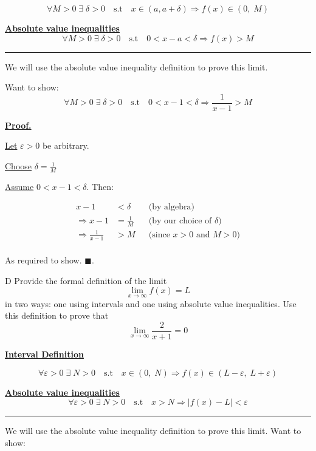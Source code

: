 \documentclass[]{article}
\begin{document}
\[
    \forall M > 0 \;\exists\;\delta > 0 \quad \text{s.t} \quad x \in(a, a+\delta)\Longrightarrow f(x) \in (0, \;M)
\]

\underline{\bf{Absolute value inequalities}}
\[
    \forall M > 0\;\exists\; \delta>0 \quad \text{s.t} \quad 
    0 < x-a < \delta \Longrightarrow f(x) >M
\]

\hrule
\vspace{0.1in}
We will use the absolute value inequality definition to prove this limit.

Want to show:
\[
    \forall M > 0\;\exists\; \delta>0 \quad \text{s.t} \quad 
    0 < x-1 < \delta \Longrightarrow \frac{1}{x-1} > M
\]


\underline{\bf{Proof.}}

\underline{Let} $\varepsilon > 0$ be arbitrary.

\medbreak

\underline{Choose} $\delta = \frac{1}{M}$

\medbreak

\underline{Assume} $0 < x-1 < \delta$. Then:

\begin{align*}
    x - 1  & < \delta
        && \text{(by algebra)} \\[6pt]
    \Longrightarrow x-1 &= \frac{1}{M} 
        && \text{(by our choice of $\delta$)} \\[6pt]
    \Longrightarrow \frac{1}{x-1}  &> M
        && \text{(since $x > 0$ and $M > 0$)} \\[6pt]
\end{align*}

As required to show. $\blacksquare$.
\begin{question}{D}
    Provide the formal definition of the limit
    \[
    \lim_{x \to \infty} f(x) = L
    \]
    in two ways: one using intervals and one using absolute value inequalities. Use this definition to prove that
    \[
    \lim_{x \to \infty} \frac{2}{x+1} = 0
    \]
\end{question}

\underline{\bf{Interval Definition}}

\[
    \forall \varepsilon> 0 \;\exists\;N > 0 \quad \text{s.t} \quad x \in(0, \;N) \Longrightarrow f(x) \in (L -\varepsilon, \;L+\varepsilon)
\]

\underline{\bf{Absolute value inequalities}}
\[
    \forall \varepsilon > 0\;\exists\; N>0 \quad \text{s.t} \quad 
    x > N \Longrightarrow |f(x) - L| < \varepsilon
\]

\hrule
\vspace{0.1in}
We will use the absolute value inequality definition to prove this limit.
Want to show:
\end{document}
